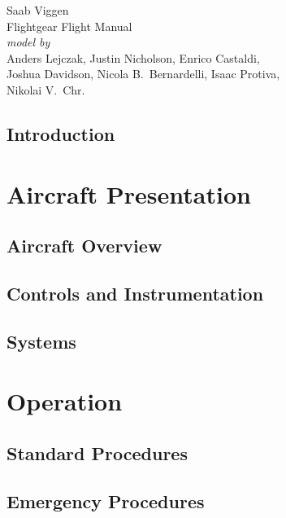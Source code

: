 \usepackage[english]{babel}
\usepackage[utf8]{inputenc}
\usepackage[T1]{fontenc}

\usepackage{graphicx}
\usepackage{hyperref}
\usepackage{wallpaper}
\usepackage{xcolor}
\usepackage{geometry}

\pagestyle{headings}


\begin{titlepage}
  \centering
  \sf
  {\Huge Saab  Viggen}
  \\[1cm]
  {\Huge Flightgear Flight Manual}
  \\[16cm]
  \color{white}
  \emph{model by}\\
  Anders Lejczak, Justin Nicholson, Enrico Castaldi,\\
  Joshua Davidson, Nicola B.\ Bernardelli, Isaac Protiva,\\
  Nikolai V.\ Chr.
\end{titlepage}
\restoregeometry

\tableofcontents

\chapter*{Introduction}

\part{Aircraft Presentation}
\chapter{Aircraft Overview}
\chapter{Controls and Instrumentation}
\chapter{Systems}

\part{Operation}
\chapter{Standard Procedures}
\chapter{Emergency Procedures}


